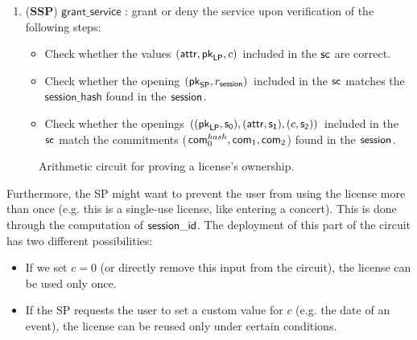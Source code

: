 \begin{enumerate}
	\item (\textbf{SSP}) $\mathsf{grant\_service}$ : grant or deny the service upon verification of the following steps:

	\begin{itemize}
		\item Check whether the values $(\mathsf{attr}, \mathsf{pk}_{\mathsf{LP}}, c)$ included in the $\mathsf{sc}$ are correct.
		\item Check whether the opening $(\mathsf{pk}_{\mathsf{SP}}, r_\mathsf{session})$ included in the $\mathsf{sc}$ matches the $\mathsf{session\_hash}$ found in the $\mathsf{session}$.
		\item Check whether the openings $((\mathsf{pk}_{\mathsf{LP}}, \mathsf{s_0}), (\mathsf{attr}, \mathsf{s_1}), (c, \mathsf{s_2}))$ included in the $\mathsf{sc}$ match the commitments ($\mathsf{com}_0^{hash}, \mathsf{com}_1, \mathsf{com}_2$) found in the $\mathsf{session}$.
	\end{itemize}

\end{enumerate}

\begin{figure}[h]
	\centering
	\setlength{\fboxsep}{5pt}%
	\setlength{\fboxrule}{0.3pt}%
	\caption{Arithmetic circuit for proving a license's ownership.}
	\label{fig:circuit_prove_nft}
\end{figure}

Furthermore, the SP might want to prevent the user from using the license more than once (e.g. this is a single-use license, like entering a concert). This is done through the computation of $\mathsf{session\_id}$. The deployment of this part of the circuit has two different possibilities:
\begin{itemize}
	\item If we set $c = 0$ (or directly remove this input from the circuit), the license can be used only once.
	\item If the SP requests the user to set a custom value for $c$ (e.g. the date of an event), the license can be reused only under certain conditions.
\end{itemize}


